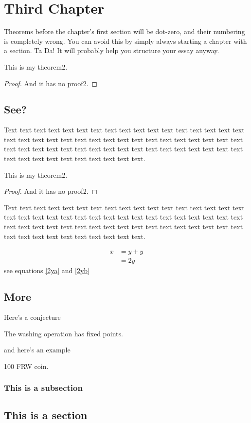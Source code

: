 \chapter{Third Chapter}

Theorems before the chapter's first section will be dot-zero, 
and their numbering is completely wrong. You can avoid this
by simply always starting a chapter with a section. Ta Da! 
It will probably help you structure your essay anyway. 

\begin{thm}[My Theorem2]
This is my theorem2.
\end{thm}
\begin{proof}
And it has no proof2.
\end{proof}

\section{See?}

Text text text text text text text text text text text text text text
text text text text text text text text text text text text text text
text text text text text text text text text text text text text text
text text text text text text text text text text text text text text
text text text text text.

\begin{thm}[My Theorem2]
This is my theorem2.
\end{thm}
\begin{proof}
And it has no proof2.
\end{proof}

Text text text text text text text text text text text text text text
text text text text text text text text text text text text text text
text text text text text text text text text text text text text text
text text text text text text text text text text text text text text
text text text text text.

\begin{align} %
\label{2ya}
x & = y + y\\
\label{2yb}
& = 2y
\end{align}
see equations \eqref{2ya} and \ref{2yb}

\section{More}

Here's a conjecture
\begin{conj}
The washing operation has fixed points.
\end{conj}

and here's an example

\begin{exa}
100 FRW coin.
\end{exa}

\subsection{This is a subsection}

\section{This is a section}

